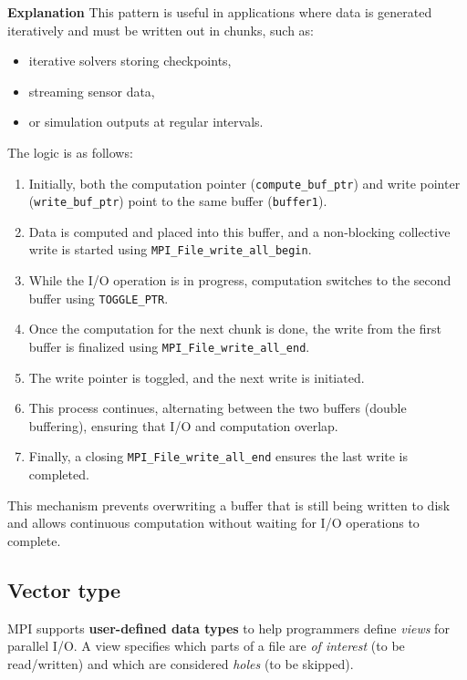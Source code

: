 \documentclass[12pt]{book}
\begin{document}
\textbf{Explanation}
This pattern is useful in applications where data is generated iteratively and must be written out in chunks, such as:
\begin{itemize}
    \item iterative solvers storing checkpoints,
    \item streaming sensor data,
    \item or simulation outputs at regular intervals.
\end{itemize}

The logic is as follows:
\begin{enumerate}
    \item Initially, both the computation pointer (\texttt{compute\_buf\_ptr}) and write pointer (\texttt{write\_buf\_ptr}) point to the same buffer (\texttt{buffer1}).
    \item Data is computed and placed into this buffer, and a non-blocking collective write is started using
    \texttt{MPI\_File\_write\_all\_begin}.
    \item While the I/O operation is in progress, computation switches to the second buffer using \texttt{TOGGLE\_PTR}.
    \item Once the computation for the next chunk is done, the write from the first buffer is finalized using
    \texttt{MPI\_File\_write\_all\_end}.
    \item The write pointer is toggled, and the next write is initiated.
    \item This process continues, alternating between the two buffers (double buffering), ensuring that I/O and computation overlap.
    \item Finally, a closing \texttt{MPI\_File\_write\_all\_end} ensures the last write is completed.
\end{enumerate}

This mechanism prevents overwriting a buffer that is still being written to disk and allows continuous computation without waiting for I/O operations to complete.

\subsection{Vector type}

MPI supports \textbf{user-defined data types} to help programmers define \textit{views} for parallel I/O.  
A view specifies which parts of a file are \textit{of interest} (to be read/written) and which are considered \textit{holes} (to be skipped).
\end{document}
